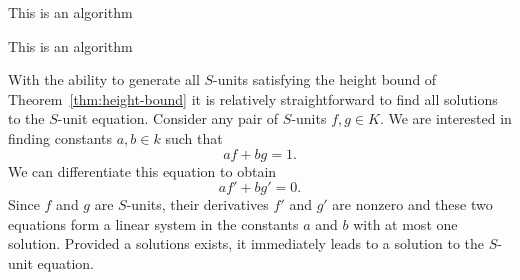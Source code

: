 \begin{algorithm}
  \caption{This is an algorithm}
  \begin{algorithmic}[1]
     
     
     
    \EndIf{}
    \EndFor{}
    \EndFor{}
    \EndFunction{}
  \end{algorithmic}
\end{algorithm}

\begin{algorithm}
  \caption{This is an algorithm}
  \begin{algorithmic}[1]
    \EndFor{}
    \EndIf{}
    \EndFor{}
    \EndFor{}
    \EndFor{}
    \EndFor{}
    \EndFor{}
    \EndFunction{}
  \end{algorithmic}
\end{algorithm}

With the ability to generate all \(S\)-units satisfying the height bound of Theorem~\ref{thm:height-bound} it is relatively straightforward to find all solutions to the \(S\)-unit equation. Consider any pair of \(S\)-units \(f, g \in K\). We are interested in finding constants \(a, b \in k\) such that
\[af + bg = 1.\]
We can differentiate this equation to obtain
\[af' + bg' = 0.\]
Since \(f\) and \(g\) are \(S\)-units, their derivatives \(f'\) and \(g'\) are nonzero and these two equations form a linear system in the constants \(a\) and \(b\) with at most one solution. Provided a solutions exists, it immediately leads to a solution to the \(S\)-unit equation.
